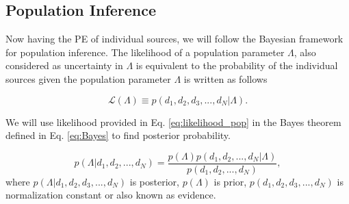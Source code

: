 \documentclass[twocolumn,prd,nofootinbib]{revtex4}
\begin{document}
    


\subsection{Population Inference}

Now having the PE of individual sources, we will follow the Bayesian framework for population inference. The likelihood of a population parameter $\Lambda$, also considered as uncertainty in $\Lambda$ is equivalent to the probability of the individual sources given the population parameter $\Lambda$ is written as follows

\begin{equation}
\label{eq:likelihood_pop}    
\mathcal{L}(\Lambda)\equiv p(d_1,d_2,d_3,...,d_N|\Lambda).
\end{equation}

 

We will use likelihood provided in Eq. \ref{eq:likelihood_pop} in the Bayes theorem defined in Eq. \ref{eq:Bayes} to find posterior probability.

\begin{equation}
\label{eq:Bayes}    
p(\Lambda|d_1,d_2,...,d_N)= \frac{p(\Lambda)p(d_1,d_2,...,d_N|\Lambda)}{p(d_1,d_2,...,d_N)},
\end{equation}
%
where $p(\Lambda|d_1,d_2,d_3,...,d_N)$ is posterior, $p(\Lambda)$ is prior, $p(d_1,d_2,d_3,...,d_N)$ is normalization constant or also known as evidence.
\end{document}

